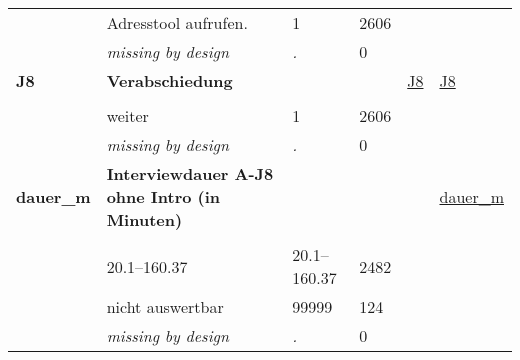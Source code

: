 \begin{longtable}{| L{2.45cm} | L{6cm} | C{1.5cm} | R{1cm} | C{2.25cm} | C{2.25cm} |}
   & Adresstool aufrufen. & 1 & 2606 &  &  \\ 
   & \textit{missing by design} & \textit{.} & 0 &  &  \\ 
   \midrule
\textbf{J8}\label{var:J8} & \textbf{Verabschiedung} &  &  & \hyperref[J8]{J8} & \hyperref[var:suf:J8]{J8} \\ 
   &  &  &  &  &  \\ 
   & weiter & 1 & 2606 &  &  \\ 
   & \textit{missing by design} & \textit{.} & 0 &  &  \\ 
   \midrule
\textbf{dauer\_m}\label{var:dauer:m} & \textbf{Interviewdauer A-J8 ohne Intro (in Minuten)} &  &  &  & \hyperref[var:suf:dauer:m]{dauer\_m} \\ 
   &  &  &  &  &  \\ 
   & 20.1--160.37 & 20.1--160.37 & 2482 &  &  \\ 
   & nicht auswertbar & 99999 & 124 &  &  \\ 
   & \textit{missing by design} & \textit{.} & 0 &  &  \\ 
  
\end{longtable}
